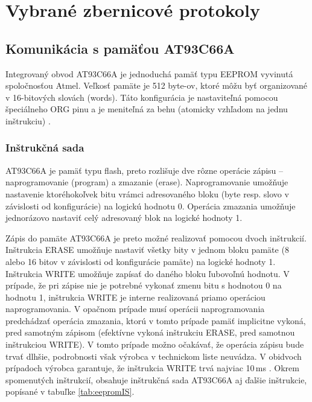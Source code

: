 \chapter{Vybrané zbernicové protokoly}
\label{kap:protokoly}

\section{Komunikácia s pamäťou AT93C66A}
Integrovaný obvod AT93C66A je jednoduchá pamäť typu EEPROM vyvinutá spoločnosťou Atmel. Veľkosť pamäte je 512 byte-ov, ktoré môžu byť organizované v 16-bitových slovách (words). Táto konfigurácia je nastaviteľná pomocou špeciálneho ORG pinu a je meniteľná za behu (atomicky vzhľadom na jednu inštrukciu) \cite{eepromDatasheet}.

\subsection{Inštrukčná sada}
AT93C66A je pamäť typu flash, preto rozlišuje dve rôzne operácie zápisu -- naprogramovanie (program) a zmazanie (erase). Naprogramovanie umožňuje nastavenie ktoréhokoľvek bitu vrámci adresovaného bloku (byte resp. slovo v závislosti od konfigurácie) na logickú hodnotu 0. Operácia zmazania umožňuje jednorázovo nastaviť celý adresovaný blok na logické hodnoty 1. 

Zápis do pamäte AT93C66A je preto možné realizovať pomocou dvoch inštrukcií. Inštrukcia ERASE umožňuje nastaviť všetky bity v jednom bloku pamäte (8 alebo 16 bitov v závislosti od konfigurácie pamäte) na logické hodnoty 1. Inštrukcia WRITE umožňuje zapísať do daného bloku ľubovoľnú hodnotu. V prípade, že pri zápise nie je potrebné vykonať zmenu bitu s hodnotou 0 na hodnotu 1, inštrukcia WRITE je interne realizovaná priamo operáciou naprogramovania. V opačnom prípade musí operácii naprogramovania predchádzať operácia zmazania, ktorú v tomto prípade pamäť implicitne vykoná, pred samotným zápisom (efektívne vykoná inštrukciu ERASE, pred samotnou inštrukciou WRITE). V tomto prípade možno očakávať, že operácia zápisu bude trvať dlhšie, podrobnosti však výrobca v technickom liste neuvádza. V obidvoch prípadoch výrobca garantuje, že inštrukcia WRITE trvá najviac 10\,ms \cite{eepromDatasheet}. Okrem spomenutých inštrukcií, obsahuje inštrukčná sada AT93C66A aj ďalšie inštrukcie, popísané v tabuľke \ref{tab:eepromIS}.

